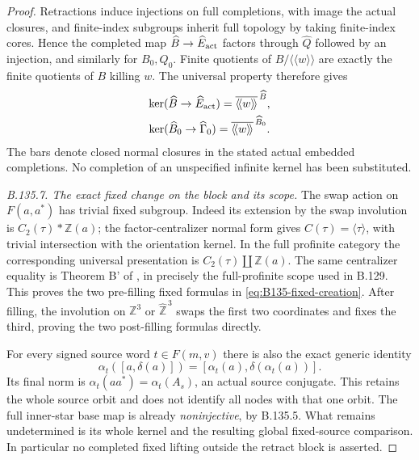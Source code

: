 \begin{proof}
Retractions induce injections on full completions, with image
the actual closures, and finite-index subgroups inherit full
topology by taking finite-index cores. Hence the completed
map $\widehat B\to\widehat E_{\rm act}$ factors through
$\widehat Q$ followed by an injection, and similarly for
$B_0,Q_0$. Finite quotients of $B/\langle\!\langle w\rangle\!\rangle$
are exactly the finite quotients of $B$ killing $w$.
The universal property therefore gives
\begin{equation}\label{eq:B135-closed-kernels}
 \begin{gathered}
 \ker(\widehat B\to\widehat E_{\rm act})
   =\overline{\langle\!\langle w\rangle\!\rangle}^{\,\widehat B},\\
 \ker(\widehat B_0\to\widehat\Gamma_0)
   =\overline{\langle\!\langle w\rangle\!\rangle}^{\,\widehat B_0}.
 \end{gathered}
\end{equation}
The bars denote closed normal closures in the stated actual
embedded completions. No completion of an unspecified
infinite kernel has been substituted.

\emph{B.135.7. The exact fixed change on the block and its scope.}
The swap action on $F(a,a^*)$ has trivial fixed subgroup.
Indeed its extension by the swap involution is
$C_2(\tau)*\mathbb Z(a)$; the factor-centralizer normal form
gives $C(\tau)=\langle\tau\rangle$, with trivial intersection
with the orientation kernel. In the full profinite category
the corresponding universal presentation is
$C_2(\tau)\amalg\widehat{\mathbb Z}(a)$.
The same centralizer equality is Theorem B' of
\citet{A_HR1985}, in precisely the full-profinite scope used
in B.129. This proves the two pre-filling fixed formulas in
\eqref{eq:B135-fixed-creation}. After filling, the involution
on $\mathbb Z^3$ or $\widehat{\mathbb Z}^{\,3}$ swaps the
first two coordinates and fixes the third, proving the two
post-filling formulas directly.

For every signed source word $t\in F(m,v)$ there is also the
exact generic identity
\[
 \alpha_t([a,\delta(a)])
   =[\alpha_t(a),\delta(\alpha_t(a))].
\]
Its final norm is
$\alpha_t(aa^*)=\alpha_t(A_s)$, an actual source conjugate.
This retains the whole source orbit and does not identify
all nodes with that one orbit. The full inner-star base map
is already \emph{noninjective}, by B.135.5. What remains
undetermined is its whole kernel and the resulting global
fixed-source comparison. In particular no completed fixed
lifting outside the retract block is asserted.
\end{proof}

